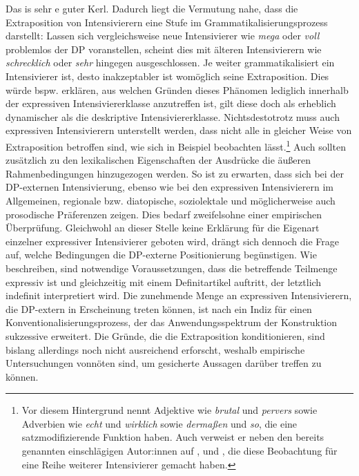 \glqq{}Das is sehr e guter Kerl\grqq{}. Dadurch liegt die Vermutung nahe, dass die Extraposition von Intensivierern eine Stufe im Grammatikalisierungsprozess darstellt: Lassen sich vergleichsweise neue Intensivierer wie \textit{mega} oder \textit{voll} problemlos der DP voranstellen, scheint dies mit älteren Intensivierern wie \textit{schrecklich} oder \textit{sehr} hingegen ausgeschlossen. Je weiter grammatikalisiert ein Intensivierer ist, desto inakzeptabler ist womöglich seine Extraposition. Dies würde bspw. erklären, aus welchen Gründen dieses Phänomen lediglich innerhalb der expressiven Intensiviererklasse anzutreffen ist, gilt diese doch als erheblich dynamischer als die deskriptive Intensiviererklasse. Nichtsdestotrotz muss auch expressiven Intensivierern unterstellt werden, dass nicht alle in gleicher Weise von Extraposition betroffen sind, wie sich in Beispiel  beobachten lässt.\footnote{Vor diesem Hintergrund nennt \citet[95]{Renz.2020} Adjektive wie \textit{brutal} und \textit{pervers} sowie Adverbien wie \textit{echt} und \textit{wirklich} sowie \textit{dermaßen} und \textit{so}, die eine satzmodifizierende Funktion haben. Auch verweist er neben den bereits genannten einschlägigen Autor:innen auf \citet[]{Schlieben.1995}, \citet[236f.]{Pittner.2006} und {\citet[190]{Schmidlin.2015}}, die diese Beobachtung für eine Reihe weiterer Intensivierer gemacht haben.} Auch sollten zusätzlich zu den lexikalischen Eigenschaften der Ausdrücke die äußeren Rahmenbedingungen hinzugezogen werden. So ist zu erwarten, dass sich bei der DP-externen Intensivierung, ebenso wie bei den expressiven Intensivierern im Allgemeinen, regionale bzw. diatopische, soziolektale und möglicherweise auch prosodische Präferenzen zeigen. Dies bedarf zweifelsohne einer empirischen Überprüfung. Gleichwohl an dieser Stelle keine Erklärung für die Eigenart einzelner expressiver Intensivierer geboten wird, drängt sich dennoch die Frage auf, welche Bedingungen die DP-externe Positionierung begünstigen. Wie \citet[]{Gutzmann.2012} beschreiben, sind notwendige Voraussetzungen, dass die betreffende Teilmenge expressiv ist und gleichzeitig mit einem Definitartikel auftritt, der letztlich indefinit interpretiert wird. Die zunehmende Menge an expressiven Intensivierern, die DP-extern in Erscheinung treten können, ist nach {\citet[168]{Androutsopoulos.1999}} ein Indiz für einen Konventionalisierungsprozess, der das Anwendungsspektrum der Konstruktion sukzessive erweitert. Die Gründe, die die Extraposition konditionieren, sind bislang allerdings noch nicht ausreichend erforscht, weshalb empirische Untersuchungen vonnöten sind, um gesicherte Aussagen darüber treffen {zu können}.

